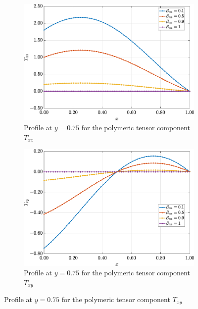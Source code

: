 \documentclass[preprint, 12pt]{elsarticle}
\begin{document}
\begin{figure}[H]
    \centering  
    \begin{subfigure}[b]{.46\textwidth}
        \includegraphics[width=\textwidth]{Slice_y_Tog_Numerical_NormErr_2nd_Betann_1_Re_1000_Wi_1_epsilon_0_xi_0_alphaG_0_Dt_1e-06_at_0.05_tipsim_1_MMS_12_x0.75y0.75_Txx.eps}
        \caption{Profile at $y=0.75$ for the polymeric tensor component $T_{xx}$}
        \label{fig_slice_y_txx_2nd_Case1_oldorydb}
    \end{subfigure}
    \vspace{0.2cm}
    \qquad
    \begin{subfigure}[b]{.46\textwidth}
        \includegraphics[width=\textwidth]{Slice_y_Tog_Numerical_NormErr_2nd_Betann_1_Re_1000_Wi_1_epsilon_0_xi_0_alphaG_0_Dt_1e-06_at_0.05_tipsim_1_MMS_12_x0.75y0.75_Txy.eps}
        \caption{Profile at $y=0.75$ for the polymeric tensor component $T_{xy}$}

\end{subfigure}
\end{figure}
\end{document}
